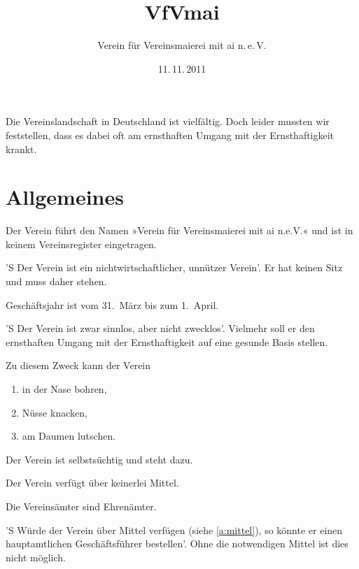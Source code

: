 \documentclass[fontsize=12pt,parskip=half]
              {scrartcl}
\begin{document}
\subject{Satzung}
\title{VfVmai}
\subtitle{Verein für Vereinsmaierei mit ai n.\,e.\,V.}
\date{11.\,11.\,2011}
\maketitle

\tableofcontents


Die Vereinslandschaft in Deutschland ist vielfältig.
Doch leider mussten wir feststellen, dass es dabei oft
am ernsthaften Umgang mit der Ernsthaftigkeit krankt.

\appendix

\section{Allgemeines}

\begin{contract}
\Clause[title={Name, Rechtsform, Sitz des Vereins}]

Der Verein führt den Namen »Verein für Vereinsmaierei mit 
ai n.e.V.« und ist in keinem Vereinsregister eingetragen.

'S Der Verein ist ein nichtwirtschaftlicher, unnützer
Verein'. Er hat keinen Sitz und muss daher stehen.

Geschäftsjahr ist vom 31.~März bis zum 1.~April.

\Clause[title={Zweck des Vereins}]

'S Der Verein ist zwar sinnlos, aber nicht zwecklos'.
Vielmehr soll er den ernsthaften Umgang mit der
Ernsthaftigkeit auf eine gesunde Basis stellen.

Zu diesem Zweck kann der Verein
\begin{enumerate}[\qquad a)]
\item in der Nase bohren,
\item Nüsse knacken,
\item am Daumen lutschen.
\end{enumerate}

Der Verein ist selbstsüchtig und steht dazu.

Der Verein verfügt über keinerlei Mittel.\label{a:mittel}

\Clause[title={Vereinsämter}]

Die Vereinsämter sind Ehrenämter.

'S Würde der Verein über Mittel verfügen 
(siehe \ref{a:mittel}), so könnte er einen
hauptamtlichen Geschäftsführer bestellen'. Ohne
die notwendigen Mittel ist dies nicht möglich.

\Clause[title={Vereinsmaier},dummy]
\label{p.maier}
\end{contract}
\end{document}
